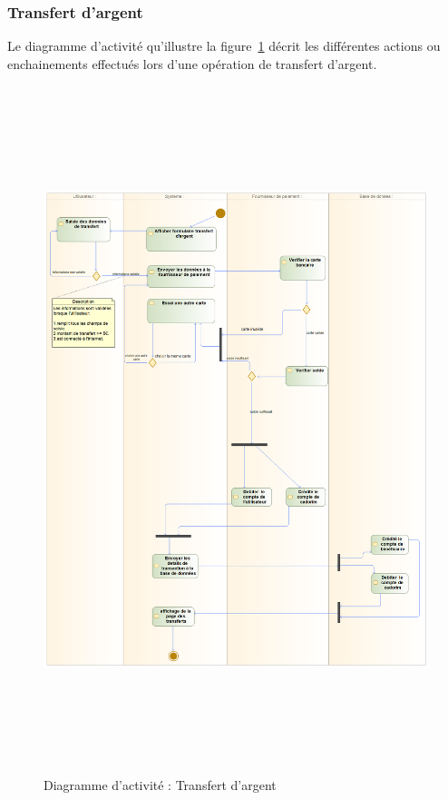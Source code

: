 \subsubsection{Transfert d'argent}
Le diagramme d’activité qu’illustre la figure~\ref{activiteTr} décrit les différentes actions ou enchainements
effectués lors d’une opération de transfert d’argent.
\begin{figure}[h!]
	\includegraphics[width=18cm, height=20cm]{./Template LaTeX/Images/trans_act.png}
	\caption{Diagramme d'activité : Transfert d'argent}
	\label{activiteTr}
\end{figure}
\newpage
